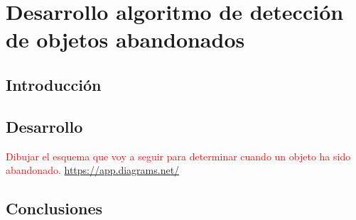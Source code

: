 
\chapter{Desarrollo algoritmo de detección de objetos abandonados}
\label{cha:desarrollo-object-detection}

\section{Introducción}
\label{sec:intro-algoritmo-abandono}

\section{Desarrollo}
\label{sec:algoritmo-abandono}

\textcolor{red}{Dibujar el esquema que voy a seguir para determinar cuando un objeto ha sido abandonado.}
\url{https://app.diagrams.net/}

\section{Conclusiones}
\label{sec:conclu-object-detection}